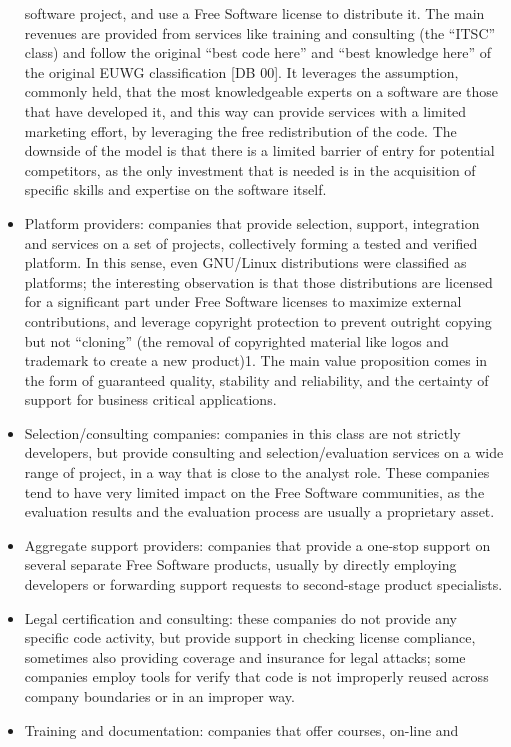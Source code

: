\begin{itemize}
software project, and use a Free Software license to distribute it. The main
revenues are provided from services like training and consulting (the “ITSC”
class) and follow the original “best code here” and “best knowledge here” of the
original EUWG classification [DB 00]. It leverages the assumption, commonly
held, that the most knowledgeable experts on a software are those that have
developed it, and this way can provide services with a limited marketing effort,
by leveraging the free redistribution of the code. The downside of the model is
that there is a limited barrier of entry for potential competitors, as the only
investment that is needed is in the acquisition of specific skills and expertise
on the software itself.
 \item Platform providers: companies that provide selection, support,
integration and services on a set of projects, collectively forming a tested and
verified platform. In this sense, even GNU/Linux distributions were classified
as platforms; the interesting observation is that those distributions are
licensed for a significant part under Free Software licenses to maximize
external contributions, and leverage copyright protection to prevent outright
copying but not “cloning” (the removal of copyrighted material like logos and
trademark to create a new product)1. The main value proposition comes in the
form of guaranteed quality, stability and reliability, and the certainty of
support for business critical applications.
 \item Selection/consulting companies: companies in this class are not strictly
developers, but provide consulting and selection/evaluation services on a wide
range of project, in a way that is close to the analyst role. These companies
tend to have very limited impact on the Free Software communities, as the
evaluation results and the evaluation process are usually a proprietary asset.
 \item Aggregate support providers: companies that provide a one-stop support on
several separate Free Software products, usually by directly employing
developers or forwarding support requests to second-stage product specialists.
 \item Legal certification and consulting: these companies do not provide any
specific code activity, but provide support in checking license compliance,
sometimes also providing coverage and insurance for legal attacks; some
companies employ tools for verify that code is not improperly reused across
company boundaries or in an improper way.
 \item Training and documentation: companies that offer courses, on-line and

\end{itemize}
